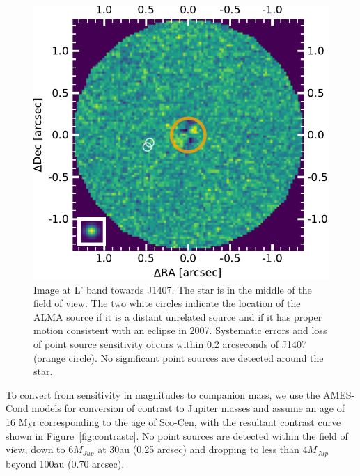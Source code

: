 \documentclass{aa} %
\begin{document}
\begin{figure}[tbh]
\begin{center}
  \includegraphics[width=\columnwidth]{J1407_NACO_result.pdf}
\caption{\label{fig:naco}Image at L' band towards J1407. The star is in the middle of the field of view. The two white circles indicate the location of the ALMA source if it is a distant unrelated source and if it has proper motion consistent with an eclipse in 2007. Systematic errors and loss of point source sensitivity occurs within 0.2 arcseconds of J1407 (orange circle). No significant point sources are detected around the star.}

\end{center}
\end{figure}%

To convert from sensitivity in magnitudes to companion mass, we use the  AMES-Cond \citep{Baraffe03,Allard01} models for conversion of contrast to Jupiter masses and assume an age of 16 Myr corresponding to the age of Sco-Cen, with the resultant contrast curve shown in Figure~\ref{fig:contrastc}.
%
No point sources are detected within the field of view, down to $6M_{Jup}$ at 30au (0.25 arcsec) and dropping to less than $4M_{Jup}$ beyond 100au (0.70 arcsec).
\end{document}

